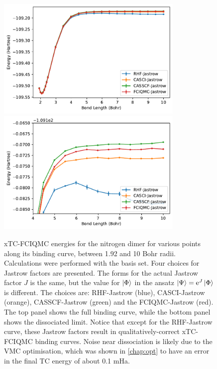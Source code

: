 \begin{figure}[htbp]
    \centering
    \includegraphics[width=0.8\textwidth]{figures/binding/all_binding_curves}
    \includegraphics[width=0.8\textwidth]{figures/binding/all_binding_curves_dissociated}
    \caption{xTC-FCIQMC energies for the nitrogen dimer for various points along its binding curve, between 1.92 and 10 Bohr radii. Calculations were performed with the \avtz basis set. Four choices for Jastrow factors are presented. The forms for the actual Jastrow factor $J$ is the same, but the value for $\ket{\Phi}$ in the ansatz $\ket\Psi=\mathrm{e}^J\ket\Phi$ is different. The choices are: RHF-Jastrow (blue), CASCI-Jastrow (orange), CASSCF-Jastrow (green) and the FCIQMC-Jastrow (red). The top panel shows the full binding curve, while the bottom panel shows the dissociated limit. Notice that except for the RHF-Jastrow curve, these Jastrow factors result in qualitatively-correct xTC-FCIQMC binding curves. Noise near dissociation is likely due to the VMC optimisation, which was shown in \autoref{chap:opt} to have an error in the final TC energy of about 0.1 mHa.
    }
    \label{fig:binding-curves-full-diss}
\end{figure}

